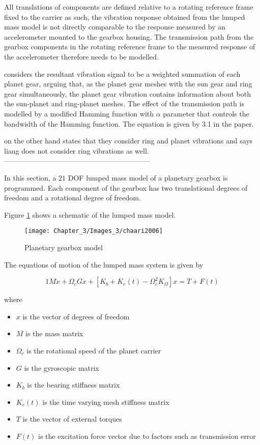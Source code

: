 All translations of components are defined relative to a rotating reference frame fixed to the carrier as such, the vibration response obtained from the lumped mass model is not directly comparable to the response measured by an accelerometer mounted to the gearbox housing. The transmission path from the gearbox components in the rotating reference frame to the measured response of the accelerometer therefore needs to be modelled.

\cite{Liang2015} considers the resultant vibration signal to be a weighted summation of each planet gear, arguing that, as the planet gear meshes with the sun gear and ring gear simultaneously, the planet gear vibration contains information about both the sun-planet and ring-planet meshes. The effect of the transmission path is modelled by a modified Hamming function with $\alpha$ parameter that controls the bandwidth of the Hamming function. The equation is given by 3.1 in the paper.

\cite{Parra2017} on the other hand states that they consider ring and planet vibrations and says liang does not consider ring vibrations as well. 
--------------------------------------------------------------


In this section, a $21$ DOF lumped mass model of a planetary gearbox \citep{Chaari2006} is programmed. Each component of the gearbox has two translational degrees of freedom and a rotational degree of freedom.

Figure \ref{F:model} shows a schematic of the lumped mass model. 

\begin{figure}[H]
	\centering
	\texttt{[image: Chapter\_3/Images\_3/chaari2006]}
	\caption{Planetary gearbox model \citep{Chaari2006}}
	\label{F:model}
\end{figure}

The equations of motion of the lumped mass system is given by 

\begin{equation}1
M \ddot{x}+\Omega_{c} G \dot{x}+\left[K_{b}+K_{e}(t)-\Omega_{c}^{2} K_{\Omega}\right] x=T+F(t)
\end{equation}

where 
\begin{itemize}
	\item $x$ is the vector of degrees of freedom
	\item $M$ is the mass matrix
	\item $\Omega_{c}$ is the rotational speed of the planet carrier
	\item $G$ is the gyroscopic matrix 
	\item $K_{b}$ is the bearing stiffness matrix
	\item $K_{e}(t)$ is the time varying mesh stiffness matrix
	\item $T$ is the vector of external torques
	\item $F(t)$ is the excitation force vector due to factors such as transmission error        
\end{itemize}

